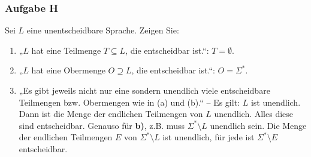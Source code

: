 \subsubsection*{Aufgabe H}
    Sei $L$ eine unentscheidbare Sprache. Zeigen Sie:

    \begin{enumerate}
        \item „$L$ hat eine Teilmenge $T \subseteq L$, die entscheidbar ist.“: $T = \emptyset$.
        \item „$L$ hat eine Obermenge $O \supseteq L$, die entscheidbar ist.“: $O = \Sigma^*$.
        \item „Es gibt jeweils nicht nur eine sondern unendlich viele entscheidbare Teilmengen bzw. Obermengen wie in (a) und (b).“ – Es gilt: $L$ ist unendlich. Dann ist die Menge der endlichen Teilmengen von $L$ unendlich. Alles diese sind entscheidbar. Genauso für \textbf{b)}, z.B. muss $\Sigma^*\setminus L$ unendlich sein. Die Menge der endlichen Teilmengen $E$ von $\Sigma^*\setminus L$ ist unendlich, für jede ist $\Sigma^*\setminus E$ entscheidbar.
    \end{enumerate}
